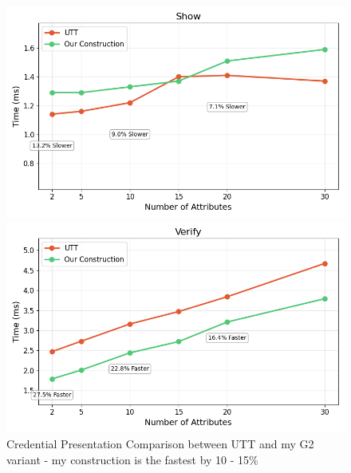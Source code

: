 \begin{figure}[!htbp]
    \begin{minipage}{0.49\textwidth}
        \centering
        \includegraphics[width=\textwidth]{figures/chap2_show_utt_vs_us.png}
    \end{minipage}
    \hspace{-1em}  %
    \begin{minipage}{0.49\textwidth}
        \centering
        \includegraphics[width=\textwidth]{figures/chap2_verify_utt_vs_us.png}
    \end{minipage}
    
    \caption[Credential Presentation Comparison - My Construction is Fastest]{Credential Presentation Comparison between UTT and my G2 variant - my construction is the fastest by 10 - 15\%}
    \label{fig:show_verify_utt_us}
\end{figure}
\vspace{-0.05cm}
